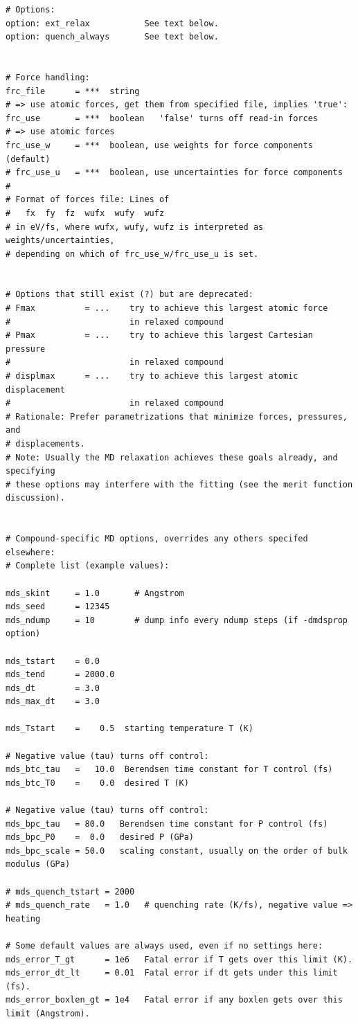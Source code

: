 \documentclass[a4paper,12pt,pdftex,onecolumn]{article}
\begin{document}
\begin{Verbatim}[fontsize=\relsize{-1},frame=single]
# Options:
option: ext_relax           See text below.
option: quench_always       See text below.


# Force handling:
frc_file      = ***  string
# => use atomic forces, get them from specified file, implies 'true':
frc_use       = ***  boolean   'false' turns off read-in forces
# => use atomic forces
frc_use_w     = ***  boolean, use weights for force components (default)
# frc_use_u   = ***  boolean, use uncertainties for force components
#
# Format of forces file: Lines of
#   fx  fy  fz  wufx  wufy  wufz
# in eV/fs, where wufx, wufy, wufz is interpreted as weights/uncertainties,
# depending on which of frc_use_w/frc_use_u is set.


# Options that still exist (?) but are deprecated:
# Fmax          = ...    try to achieve this largest atomic force
#                        in relaxed compound
# Pmax          = ...    try to achieve this largest Cartesian pressure
#                        in relaxed compound
# displmax      = ...    try to achieve this largest atomic displacement
#                        in relaxed compound
# Rationale: Prefer parametrizations that minimize forces, pressures, and
# displacements.
# Note: Usually the MD relaxation achieves these goals already, and specifying
# these options may interfere with the fitting (see the merit function discussion).


# Compound-specific MD options, overrides any others specifed elsewhere:
# Complete list (example values):

mds_skint     = 1.0       # Angstrom
mds_seed      = 12345
mds_ndump     = 10        # dump info every ndump steps (if -dmdsprop option)

mds_tstart    = 0.0
mds_tend      = 2000.0
mds_dt        = 3.0
mds_max_dt    = 3.0

mds_Tstart    =    0.5  starting temperature T (K)

# Negative value (tau) turns off control:
mds_btc_tau   =   10.0  Berendsen time constant for T control (fs)
mds_btc_T0    =    0.0  desired T (K)

# Negative value (tau) turns off control:
mds_bpc_tau   = 80.0   Berendsen time constant for P control (fs)
mds_bpc_P0    =  0.0   desired P (GPa)
mds_bpc_scale = 50.0   scaling constant, usually on the order of bulk modulus (GPa)

# mds_quench_tstart = 2000
# mds_quench_rate   = 1.0   # quenching rate (K/fs), negative value => heating

# Some default values are always used, even if no settings here:
mds_error_T_gt      = 1e6   Fatal error if T gets over this limit (K).
mds_error_dt_lt     = 0.01  Fatal error if dt gets under this limit (fs).
mds_error_boxlen_gt = 1e4   Fatal error if any boxlen gets over this limit (Angstrom).

\end{Verbatim}
\end{document}
